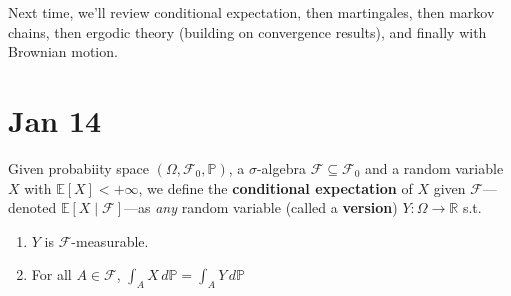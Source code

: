   Next time, we'll review conditional expectation, then martingales, then markov chains, then ergodic theory (building on convergence results), and finally with Brownian motion.

\section{Jan 14} 

	\begin{definition}
		Given probabiity space $(\Omega, \mathscr{F}_0, \mathbb{P})$, a $\sigma$-algebra $\mathscr{F} \subseteq \mathscr{F}_0$ and a random variable $X$ with $\mathbb{E}[X] < +\infty$, we define the \textbf{conditional expectation} of $X$ given $\mathscr{F}$---denoted $\mathbb{E}[X \mid \mathscr{F}]$---as \textit{any} random variable (called a \textbf{version}) $Y: \Omega \to \mathbb{R}$ s.t. 
		\begin{enumerate}
			\item $Y$ is $\mathscr{F}$-measurable. 
			\item For all $A \in \mathscr{F}$, $\int_A X \,d\mathbb{P} = \int_A Y \,d\mathbb{P}$
		\end{enumerate}
	\end{definition}
